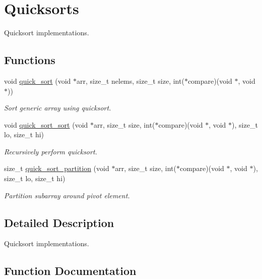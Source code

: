 \hypertarget{group__QuickSort}{}\section{Quicksorts}
\label{group__QuickSort}


Quicksort implementations.  


\subsection*{Functions}
\begin{DoxyCompactItemize}
\item 
void \hyperlink{group__QuickSort_ga7aea235f1d6b3dff511a11e02d27be68}{quick\+\_\+sort} (void $\ast$arr, size\+\_\+t nelems, size\+\_\+t size, int($\ast$compare)(void $\ast$, void $\ast$))
\begin{DoxyCompactList}\small\item\em Sort generic array using quicksort. \end{DoxyCompactList}\item 
void \hyperlink{group__QuickSort_ga81da4500a40b9f11155fb6b1c6edf3d8}{quick\+\_\+sort\+\_\+sort} (void $\ast$arr, size\+\_\+t size, int($\ast$compare)(void $\ast$, void $\ast$), size\+\_\+t lo, size\+\_\+t hi)
\begin{DoxyCompactList}\small\item\em Recursively perform quicksort. \end{DoxyCompactList}\item 
size\+\_\+t \hyperlink{group__QuickSort_ga093c6d71dca8ea2ea18ba4f6b6e63359}{quick\+\_\+sort\+\_\+partition} (void $\ast$arr, size\+\_\+t size, int($\ast$compare)(void $\ast$, void $\ast$), size\+\_\+t lo, size\+\_\+t hi)
\begin{DoxyCompactList}\small\item\em Partition subarray around pivot element. \end{DoxyCompactList}\end{DoxyCompactItemize}


\subsection{Detailed Description}
Quicksort implementations. 



\subsection{Function Documentation}
\mbox{\label{group__QuickSort_ga7aea235f1d6b3dff511a11e02d27be68}} 
